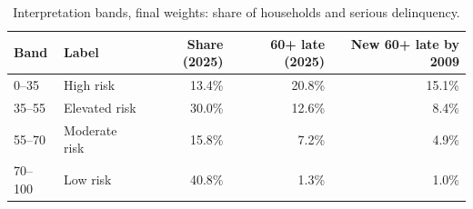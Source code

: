 \begin{table}[htbp]
\centering
\small
\caption{Interpretation bands, final weights: share of households and serious delinquency.}
\label{tab:bands}
\begin{tabular}{llrrr}
\toprule
Band & Label & Share (2025) & 60+ late (2025) & New 60+ late by 2009 \\
\midrule
0--35 & High risk & 13.4\% & 20.8\% & 15.1\% \\
35--55 & Elevated risk & 30.0\% & 12.6\% & 8.4\% \\
55--70 & Moderate risk & 15.8\% & 7.2\% & 4.9\% \\
70--100 & Low risk & 40.8\% & 1.3\% & 1.0\% \\
\bottomrule
\end{tabular}
\end{table}
